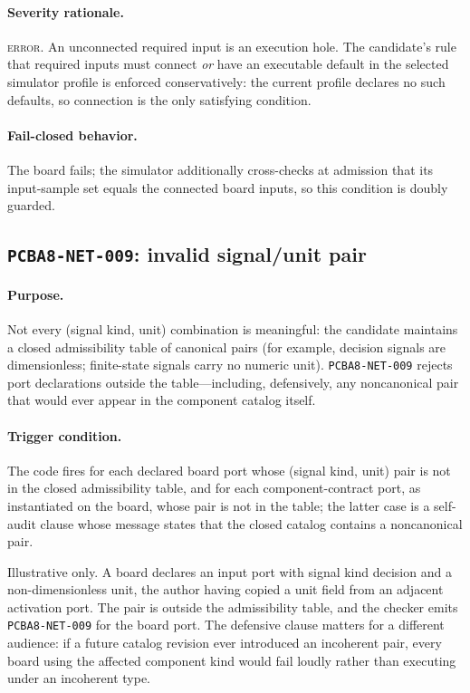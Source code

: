 \paragraph{Severity rationale.} \textsc{error}. An unconnected required input is an execution hole. The candidate's rule that required inputs must connect \emph{or} have an executable default in the selected simulator profile is enforced conservatively: the current profile declares no such defaults, so connection is the only satisfying condition.

\paragraph{Fail-closed behavior.} The board fails; the simulator additionally cross-checks at admission that its input-sample set equals the connected board inputs, so this condition is doubly guarded.

\subsection{\texttt{PCBA8-NET-009}: invalid signal/unit pair}\label{ch07:sub:net009}

\paragraph{Purpose.} Not every (signal kind, unit) combination is meaningful: the candidate maintains a closed admissibility table of canonical pairs (for example, decision signals are dimensionless; finite-state signals carry no numeric unit). \texttt{PCBA8-NET-009} rejects port declarations outside the table---including, defensively, any noncanonical pair that would ever appear in the component catalog itself.

\paragraph{Trigger condition.} The code fires for each declared board port whose (signal kind, unit) pair is not in the closed admissibility table, and for each component-contract port, as instantiated on the board, whose pair is not in the table; the latter case is a self-audit clause whose message states that the closed catalog contains a noncanonical pair.

\begin{example}\label{ch07:ex:net009}
Illustrative only. A board declares an input port with signal kind decision and a non-dimensionless unit, the author having copied a unit field from an adjacent activation port. The pair is outside the admissibility table, and the checker emits \texttt{PCBA8-NET-009} for the board port. The defensive clause matters for a different audience: if a future catalog revision ever introduced an incoherent pair, every board using the affected component kind would fail loudly rather than executing under an incoherent type.
\end{example}

